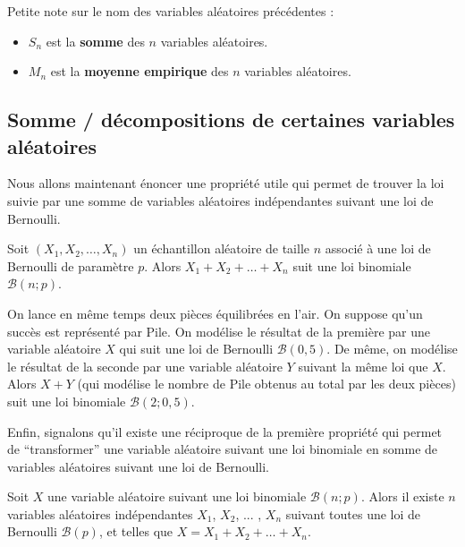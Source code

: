 	\begin{tip}[Note]
		Petite note sur le nom des variables aléatoires précédentes :
		\begin{itemize}
			\item $S_n$ est la \textbf{somme} des $n$ variables aléatoires.
			\item $M_n$ est la \textbf{moyenne empirique} des $n$ variables aléatoires.
		\end{itemize}
	\end{tip}

	\subsection{Somme / décompositions de certaines variables aléatoires}

	Nous allons maintenant énoncer une propriété utile qui permet de trouver la loi suivie par une somme de variables aléatoires indépendantes suivant une loi de Bernoulli.

	\begin{formula}
		Soit $(X_1, X_2, \dots, X_n)$ un échantillon aléatoire de taille $n$ associé à une loi de Bernoulli de paramètre $p$.
		\newpar
		Alors $X_1 + X_2 + \dots + X_n$ suit une loi binomiale $\mathcal{B}(n; p)$.
	\end{formula}

	\begin{tip}[Exemple]
		On lance en même temps deux pièces équilibrées en l'air. On suppose qu'un succès est représenté par Pile.
		\newpar
		On modélise le résultat de la première par une variable aléatoire $X$ qui suit une loi de Bernoulli $\mathcal{B}(0,5)$. De même, on modélise le résultat de la seconde par une variable aléatoire $Y$ suivant la même loi que $X$.
		\newpar
		Alors $X + Y$ (qui modélise le nombre de Pile obtenus au total par les deux pièces) suit une loi binomiale $\mathcal{B}(2; 0,5)$.
	\end{tip}

	Enfin, signalons qu'il existe une réciproque de la première propriété qui permet de ``transformer'' une variable aléatoire suivant une loi binomiale en somme de variables aléatoires suivant une loi de Bernoulli.

	\begin{formula}
		Soit $X$ une variable aléatoire suivant une loi binomiale $\mathcal{B}(n; p)$.
		\newpar
		Alors il existe $n$ variables aléatoires indépendantes $X_1$, $X_2$, ... , $X_n$ suivant toutes une loi de Bernoulli $\mathcal{B}(p)$, et telles que $X = X_1 + X_2 + \dots + X_n$.
	\end{formula}


